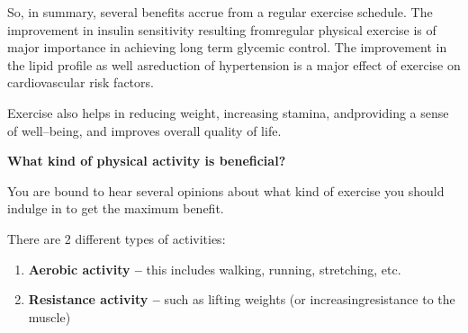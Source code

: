 So, in summary, several benefits accrue from a regular exercise schedule. The improvement in insulin sensitivity resulting from\break regular physical exercise is of major importance in achieving long term glycemic control. The improvement in the lipid profile as well as\break reduction of hypertension is a major effect of exercise on cardio\-va\-scular risk factors.

Exercise also helps in reducing weight, increasing stamina, and\break providing a sense of well–being, and improves overall quality of life.

\noindent\textbf{What kind of physical activity is beneficial?}

You are bound to hear several opinions about what kind of exercise you should indulge in to get the maximum benefit.

\noindent There are 2 different types of activities:

\begin{enumerate}
\itemsep=0pt
\item \textbf{Aerobic activity –} this includes walking, running, stretching, etc.
\item \textbf{Resistance activity –} such as lifting weights (or increasing\break resistance to the muscle)
\end{enumerate}

